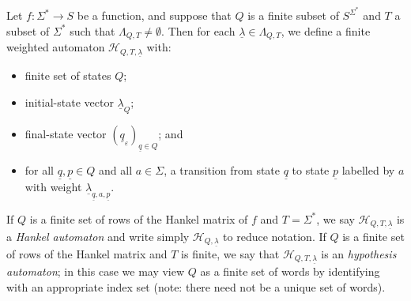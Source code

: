 \documentclass{lmcs}
\numberwithin{theorem}{section}
\begin{document}
\begin{defi}
\label{definition:hankel}
Let $f: \Sigma^* \rightarrow S$ be a function, and suppose that $Q$ is a finite subset of $S^{\Sigma^*}$ and $T$ a subset of $\Sigma^*$ such that $\Lambda_{Q, T} \neq \emptyset$. Then for each $\underline{\lambda} \in \Lambda_{Q, T}$, we define a finite weighted automaton $\mathcal{H}_{Q, T, \underline{\lambda}}$ with:
\begin{itemize}
\item finite set of states $Q$;
\item initial-state vector $\underline{\lambda}_Q$;
\item final-state vector $(\underline{q} _\varepsilon)_{\underline{q} \in Q}$; and
\item for all $\underline{q},\underline{p} \in Q$ and all $a \in \Sigma$, a transition from state $\underline{q}$ to state $\underline{p}$ labelled by $a$ with weight $\underline{\lambda}_{\underline{q},a,\underline{p}}$.
\end{itemize}
If $Q$ is a finite set of rows of the Hankel matrix of $f$ and $T = \Sigma^*$,  we say $\mathcal{H}_{Q, T, \underline{\lambda}}$ is a \emph{Hankel automaton} and write simply $\mathcal{H}_{Q, \underline{\lambda}}$ to reduce notation. If $Q$ is a finite set of rows of the Hankel matrix and $T$ is finite, we say that $\mathcal{H}_{Q, T, \underline{\lambda}}$ is an \emph{hypothesis automaton}; in this case we may view $Q$ as a finite set of words by identifying with an appropriate index set (note: there need not be a unique set of words).\end{defi} 
\end{document}
